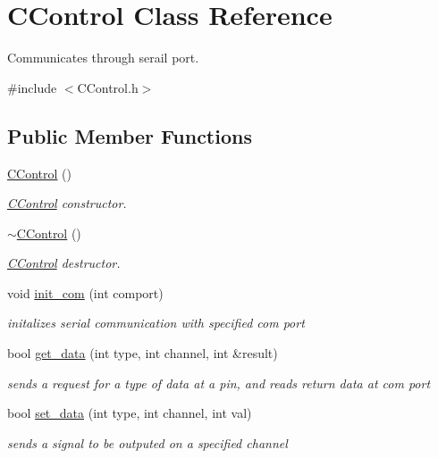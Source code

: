 \hypertarget{class_c_control}{}\section{C\+Control Class Reference}
\label{class_c_control}


Communicates through serail port.  




{\ttfamily \#include $<$C\+Control.\+h$>$}

\subsection*{Public Member Functions}
\begin{DoxyCompactItemize}
\item 
\hyperlink{class_c_control_a6498500ff403327b5770a3acebed1d93}{C\+Control} ()
\begin{DoxyCompactList}\small\item\em \hyperlink{class_c_control}{C\+Control} constructor. \end{DoxyCompactList}\item 
\hyperlink{class_c_control_ab2ae420ef75b010c0c9078e597781105}{$\sim$\+C\+Control} ()
\begin{DoxyCompactList}\small\item\em \hyperlink{class_c_control}{C\+Control} destructor. \end{DoxyCompactList}\item 
void \hyperlink{class_c_control_a3d1384d0e1ee2a4a478a798b46457468}{init\+\_\+com} (int comport)
\begin{DoxyCompactList}\small\item\em initalizes serial communication with specified com port \end{DoxyCompactList}\item 
bool \hyperlink{class_c_control_a0bad8e51e54cb6f1e2a7b51d3a3940d3}{get\+\_\+data} (int type, int channel, int \&result)
\begin{DoxyCompactList}\small\item\em sends a request for a type of data at a pin, and reads return data at com port \end{DoxyCompactList}\item 
bool \hyperlink{class_c_control_a13f557815616ef66a8f5dd4b725d8c32}{set\+\_\+data} (int type, int channel, int val)
\begin{DoxyCompactList}\small\item\em sends a signal to be outputed on a specified channel \end{DoxyCompactList}\item 

\end{DoxyCompactItemize}
